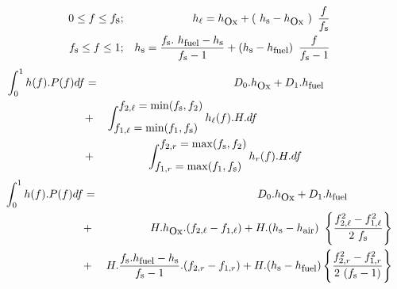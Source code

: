 \begin{eqnarray}
\displaystyle 0  \le f \le f_{\mbox{s}} &;& h_{\ell} = h_{\mbox{\small Ox}} + \left(~h_{\mbox{\footnotesize s}} - h_{\mbox{\small Ox}}~\right)~\frac{f}{f_{\mbox{\footnotesize s}}} \nonumber\\
\displaystyle f_{\mbox{\footnotesize s}} \le f \le 1  &;& h_{\mbox{\footnotesize s}} = \frac{f_{\mbox{\footnotesize s}}.~h_{\mbox{\footnotesize fuel}} - h_{\mbox{\footnotesize s}} }{f_{\mbox{\footnotesize s}}-1} + \left( h_{\mbox{\footnotesize s}}-h_{\mbox{\footnotesize fuel}} \right)~\frac{f}{f_{\mbox{\footnotesize s}}-1}
\end{eqnarray}\vspace{-0.22in}
\begin{eqnarray}
\displaystyle\int_{0}^1 h(f) . P(f) df &=& D_0.h_{\mbox{\small Ox}} + D_1.h_{\mbox{\footnotesize fuel}} \qquad\qquad\qquad\nonumber \\
                          &+& \int_{\displaystyle f_{1,\ell} = \min(f_1,f_{\mbox{\footnotesize s}})}^{\displaystyle f_{2,\ell} = \min(f_{\mbox{\footnotesize s}},f_2)} h_{\ell}(f) . H . df \qquad\qquad\qquad\qquad\qquad\qquad\label{Eqs_00B} \\
\displaystyle                          &+& \int_{\textstyle f_{1,r} = \max(f_1,f_{\mbox{\footnotesize s}})}^{\textstyle f_{2,r} = \max(f_{\mbox{\footnotesize s}},f_2)} h_{r}(f) . H . df \qquad\qquad\qquad\qquad\nonumber
\end{eqnarray}
\vspace{-0.22in}
\begin{eqnarray}
\int_{0}^1 h(f) . P(f) df &=& D_0.h_{\mbox{\small Ox}} + D_1.h_{\mbox{\footnotesize fuel}} \qquad \qquad\nonumber \\
                          &+& H. h_{\mbox{\small Ox}} . (f_{2,\ell}-f_{1,\ell})
                           +  H.(h_{\mbox{\footnotesize s}}-h_{\mbox{\footnotesize air}})~
\left\{ \frac{f_{2,\ell}^2-f_{1,\ell}^2}{2~f_{\mbox{\footnotesize s}}} \right\}\label{Eqs_00C} \\
                          &+& H . \frac{f_{\mbox{\footnotesize s}}.h_{\mbox{\footnotesize fuel}}-h_{\mbox{\footnotesize s}}}{f_{\mbox{\footnotesize s}}-1} . (f_{2,r}-f_{1,r}) + H. (h_{\mbox{\footnotesize s}}-h_{\mbox{\footnotesize fuel}})
\displaystyle \left\{ \displaystyle \frac{f_{2,r}^2-f_{1,r}^2}{2~(f_{\mbox{\footnotesize s}}-1)} \right\}\nonumber
\end{eqnarray}
\vspace{-0.25in}
